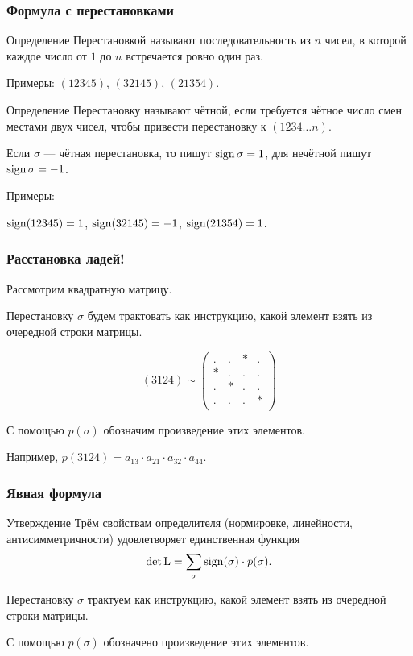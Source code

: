 \begin{frame}
    \frametitle{Формула с перестановками}

    \begin{block}{Определение}
        \alert{Перестановкой} называют последовательность из $n$ чисел, 
        в которой каждое число от $1$ до $n$ встречается ровно один раз.
    \end{block}

    \pause
    Примеры: $(12345)$, $(32145)$, $(21354)$.

    \pause
    \begin{block}{Определение}
    Перестановку называют \alert{чётной}, если требуется чётное число смен местами двух чисел,
    чтобы привести перестановку к $(1234\ldots n)$.

    Если $\sigma$ — чётная перестановка, то пишут $\operatorname{sign} \sigma  = 1$,
    для нечётной пишут $\operatorname{sign}\sigma = -1$.
\end{block}
\pause
Примеры: 

$\operatorname{sign}(12345) = 1$, $\operatorname{sign}(32145)=-1$, $\operatorname{sign}(21354)=1$.


\end{frame}



\begin{frame}
\frametitle{Расстановка ладей!}

    Рассмотрим квадратную матрицу. 

    Перестановку $\sigma$ будем трактовать как инструкцию, какой элемент взять из очередной строки матрицы.
    
    \[
    (3124) \sim \begin{pmatrix}
    . & . & * & . \\
    * & . & . & . \\
    . & * & . & . \\
    . & . & . & * \\
    \end{pmatrix}    
    \]

    \pause

    С помощью $p(\sigma)$ обозначим произведение этих элементов. 

    Например, $p(3124) = a_{13} \cdot a_{21} \cdot a_{32} \cdot a_{44}$.


\end{frame}


\begin{frame}
\frametitle{Явная формула}

\begin{block}{Утверждение}
Трём свойствам определителя (нормировке, линейности, антисимметричности) удовлетворяет единственная функция
\[
    \det \operatorname{L} = \sum_{\sigma} \operatorname{sign} (\sigma) \cdot p(\sigma).
\]

Перестановку $\sigma$ трактуем как инструкцию, какой элемент взять из очередной строки матрицы.

С помощью $p(\sigma)$ обозначено произведение этих элементов. 

\end{block}


\end{frame}


